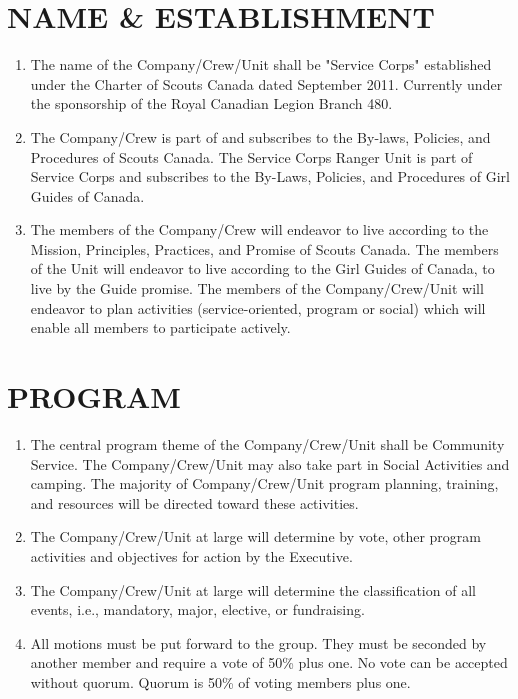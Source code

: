 \documentclass{Service_Corps_Document}
\begin{document}
    \def \Title {Constitution}
    \def \Company {Service Corps}
    \def \versionNumber {4.1}
    \stdFooter
    \begin{titlepage}
        \stdTitlePage
    \end{titlepage}

    \tableofcontents	
            
    \newpage


    \section{NAME \& ESTABLISHMENT}
    \begin{enumerate}
        \item The name of the Company/Crew/Unit shall be "Service Corps" established under the Charter of Scouts Canada dated September 2011. Currently under the sponsorship of the Royal Canadian Legion Branch 480.
        \item The Company/Crew is part of and subscribes to the By-laws, Policies, and Procedures of Scouts Canada. The Service Corps Ranger Unit is part of Service Corps and subscribes to the By-Laws, Policies, and Procedures of Girl Guides of Canada.
        \item The members of the Company/Crew will endeavor to live according to the Mission, Principles, Practices, and Promise of Scouts Canada. The members of the Unit will endeavor to live according to the Girl Guides of Canada, to live by the Guide promise. The members of the Company/Crew/Unit will endeavor to plan activities (service-oriented, program or social) which will enable all members to participate actively.
    \end{enumerate}


    \section{PROGRAM}
    \begin{enumerate}
        \item The central program theme of the Company/Crew/Unit shall be Community Service. The Company/Crew/Unit may also take part in Social Activities and camping. The majority of Company/Crew/Unit program planning, training, and resources will be directed toward these activities. 
        \item The Company/Crew/Unit at large will determine by vote, other program activities and objectives for action by the Executive.
        \item The Company/Crew/Unit at large will determine the classification of all events, i.e., mandatory, major, elective, or fundraising.
        \item All motions must be put forward to the group. They must be seconded by another member and require a vote of 50\% plus one. No vote can be accepted without quorum. Quorum is 50\% of voting members plus one.
    \end{enumerate}
\end{document}
